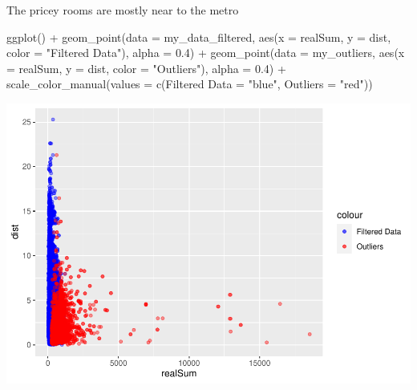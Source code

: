 \documentclass[
]{article}
\newenvironment{Shaded}{\begin{snugshade}}{\end{snugshade}}
\newcommand{\AttributeTok}[1]{\textcolor[rgb]{0.77,0.63,0.00}{#1}}
\newcommand{\FloatTok}[1]{\textcolor[rgb]{0.00,0.00,0.81}{#1}}
\newcommand{\FunctionTok}[1]{\textcolor[rgb]{0.00,0.00,0.00}{#1}}
\newcommand{\NormalTok}[1]{#1}
\newcommand{\OtherTok}[1]{\textcolor[rgb]{0.56,0.35,0.01}{#1}}
\newcommand{\SpecialCharTok}[1]{\textcolor[rgb]{0.00,0.00,0.00}{#1}}
\newcommand{\StringTok}[1]{\textcolor[rgb]{0.31,0.60,0.02}{#1}}
\begin{document}
The pricey rooms are mostly near to the metro

\begin{Shaded}
\begin{Highlighting}[]
\FunctionTok{ggplot}\NormalTok{() }\SpecialCharTok{+} \FunctionTok{geom\_point}\NormalTok{(}\AttributeTok{data =}\NormalTok{ my\_data\_filtered, }\FunctionTok{aes}\NormalTok{(}\AttributeTok{x =}\NormalTok{ realSum,}
    \AttributeTok{y =}\NormalTok{ dist, }\AttributeTok{color =} \StringTok{"Filtered Data"}\NormalTok{), }\AttributeTok{alpha =} \FloatTok{0.4}\NormalTok{) }\SpecialCharTok{+} \FunctionTok{geom\_point}\NormalTok{(}\AttributeTok{data =}\NormalTok{ my\_outliers,}
    \FunctionTok{aes}\NormalTok{(}\AttributeTok{x =}\NormalTok{ realSum, }\AttributeTok{y =}\NormalTok{ dist, }\AttributeTok{color =} \StringTok{"Outliers"}\NormalTok{), }\AttributeTok{alpha =} \FloatTok{0.4}\NormalTok{) }\SpecialCharTok{+}
    \FunctionTok{scale\_color\_manual}\NormalTok{(}\AttributeTok{values =} \FunctionTok{c}\NormalTok{(}\StringTok{\textasciigrave{}}\AttributeTok{Filtered Data}\StringTok{\textasciigrave{}} \OtherTok{=} \StringTok{"blue"}\NormalTok{, }\AttributeTok{Outliers =} \StringTok{"red"}\NormalTok{))}
\end{Highlighting}
\end{Shaded}

\includegraphics{Project_files/figure-latex/unnamed-chunk-16-1.pdf}
\end{document}
